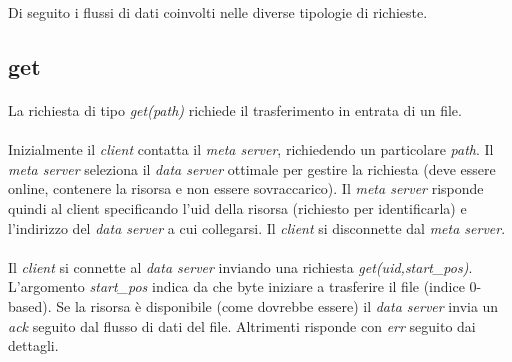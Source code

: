 \documentclass{article}
\begin{document}
Di seguito i flussi di dati coinvolti nelle diverse tipologie di richieste.

\subsection{get}

\paragraph{} La richiesta di tipo \emph{get(path)} richiede il trasferimento in entrata di un file. 

\paragraph{} Inizialmente il \emph{client} contatta il \emph{meta server}, richiedendo un particolare \emph{path}. Il \emph{meta server} seleziona il \emph{data server} ottimale per gestire la richiesta (deve essere online, contenere la risorsa e non essere sovraccarico). Il \emph{meta server} risponde quindi al client specificando l'uid della risorsa (richiesto per identificarla) e l'indirizzo del \emph{data server} a cui collegarsi. Il \emph{client} si disconnette dal \emph{meta server}.

\paragraph{} Il \emph{client} si connette al \emph{data server} inviando una richiesta \emph{get(uid,start\_pos)}. L'argomento \emph{start\_pos} indica da che byte iniziare a trasferire il file (indice 0-based). Se la risorsa è disponibile (come dovrebbe essere) il \emph{data server} invia un \emph{ack} seguito dal flusso di dati del file. Altrimenti risponde con \emph{err} seguito dai dettagli. 
\end{document}
